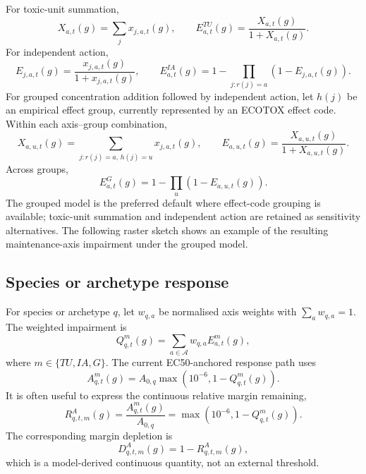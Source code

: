 For toxic-unit summation,
\begin{equation}
  X_{a,t}(g)=\sum_j x_{j,a,t}(g),
  \qquad
  E_{a,t}^{TU}(g)=\frac{X_{a,t}(g)}{1+X_{a,t}(g)}.
\end{equation}
For independent action,
\begin{equation}
  E_{j,a,t}(g)=\frac{x_{j,a,t}(g)}{1+x_{j,a,t}(g)},
  \qquad
  E_{a,t}^{IA}(g)=1-\prod_{j:r(j)=a}\left(1-E_{j,a,t}(g)\right).
\end{equation}
For grouped concentration addition followed by independent action, let $h(j)$ be an empirical effect group, currently represented by an ECOTOX effect code. Within each axis--group combination,
\begin{equation}
  X_{a,u,t}(g)=\sum_{j:r(j)=a,\,h(j)=u}x_{j,a,t}(g),
  \qquad
  E_{a,u,t}(g)=\frac{X_{a,u,t}(g)}{1+X_{a,u,t}(g)}.
\end{equation}
Across groups,
\begin{equation}
  E_{a,t}^{G}(g)=1-\prod_u\left(1-E_{a,u,t}(g)\right).
  \label{eq:grouped_ca_ia}
\end{equation}
The grouped model is the preferred default where effect-code grouping is available; toxic-unit summation and independent action are retained as sensitivity alternatives. The following raster sketch shows an example of the resulting maintenance-axis impairment under the grouped model.

\begin{center}
\drawRasterAxis
\end{center}

\subsection{Species or archetype response}

For species or archetype $q$, let $w_{q,a}$ be normalised axis weights with $\sum_a w_{q,a}=1$. The weighted impairment is
\begin{equation}
  Q_{q,t}^{m}(g)=\sum_{a\in\mathcal{A}}w_{q,a}E_{a,t}^{m}(g),
  \label{eq:Q_updated}
\end{equation}
where $m\in\{TU,IA,G\}$. The current EC50-anchored response path uses
\begin{equation}
  A_{q,t}^{m}(g)=A_{0,q}\max\left(10^{-6},1-Q_{q,t}^{m}(g)\right).
  \label{eq:A_updated}
\end{equation}
It is often useful to express the continuous relative margin remaining,
\begin{equation}
  R^A_{q,t,m}(g)=\frac{A_{q,t}^{m}(g)}{A_{0,q}}
  =\max\left(10^{-6},1-Q_{q,t}^{m}(g)\right).
\end{equation}
The corresponding margin depletion is
\begin{equation}
  D^A_{q,t,m}(g)=1-R^A_{q,t,m}(g),
\end{equation}
which is a model-derived continuous quantity, not an external threshold.

